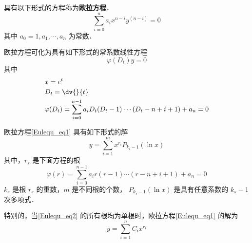 

具有以下形式的方程称为\textbf{欧拉方程}．
\begin{equation}\label{Eulequ_eq1}
\sum_{i=0}^{n}a_ix^{n-i}y^{(n-i)}=0
\end{equation}
其中 $a_0=1,a_1,\cdots,a_n$ 为常数．

欧拉方程可化为具有如下形式的常系数线性方程
\begin{equation}\label{Eulequ_eq4}
\varphi(D_t)y=0
\end{equation}
其中
\begin{equation}
\begin{aligned}
&x=e^t\\
&D_t=\dv{}{t}\\
&\varphi(D_t)=\sum_{i=0}^{n-1}a_iD_t(D_t-1)\cdots(D_t-n+i+1)+a_n=0
\end{aligned}
\end{equation}

欧拉方程\autoref{Eulequ_eq1} 具有如下形式的解
\begin{equation}\label{Eulequ_eq6}
y=\sum_{i=1}^mx^{r_i}P_{k_i-1}(\ln x)
\end{equation}
其中，$r_s$ 是下面方程的根
\begin{equation}\label{Eulequ_eq2}
\varphi(r)=\sum_{i=0}^{n-1}a_ir(r-1)\cdots(r-n+i+1)+a_n=0
\end{equation}
$k_s$ 是根 $r_s$ 的重数，$m$ 是不同根的个数， $P_{k_s-1}(\ln x)$ 是具有任意系数的 $k_s-1$ 次多项式． 

特别的，当\autoref{Eulequ_eq2} 的所有根均为单根时，欧拉方程\autoref{Eulequ_eq1} 的解为
\begin{equation}
y=\sum_{i=1}^{n}C_ix^{r_i}
\end{equation}

